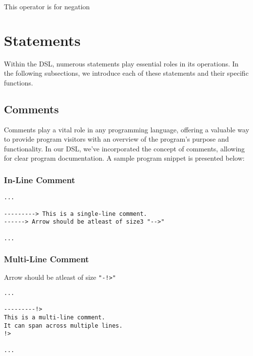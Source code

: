 \documentclass{article}
\begin{document}
This operator is for negation

\section{Statements}
Within the DSL, numerous statements play essential roles in its operations. In the following subsections, we introduce each of these statements and their specific functions.

\subsection{Comments}
Comments play a vital role in any programming language, offering a valuable way to provide program visitors with an overview of the program's purpose and functionality. In our DSL, we've incorporated the concept of comments, allowing for clear program documentation. A sample program snippet is presented below:

\subsubsection{In-Line Comment}
\begin{verbatim}
...

---------> This is a single-line comment.
------> Arrow should be atleast of size3 "-->"

...
\end{verbatim}

\subsubsection{Multi-Line Comment}
Arrow should be atleast of size \texttt{"-!>"}
\begin{verbatim}
...

---------!>
This is a multi-line comment.
It can span across multiple lines.
!>

...
\end{verbatim}
\end{document}
